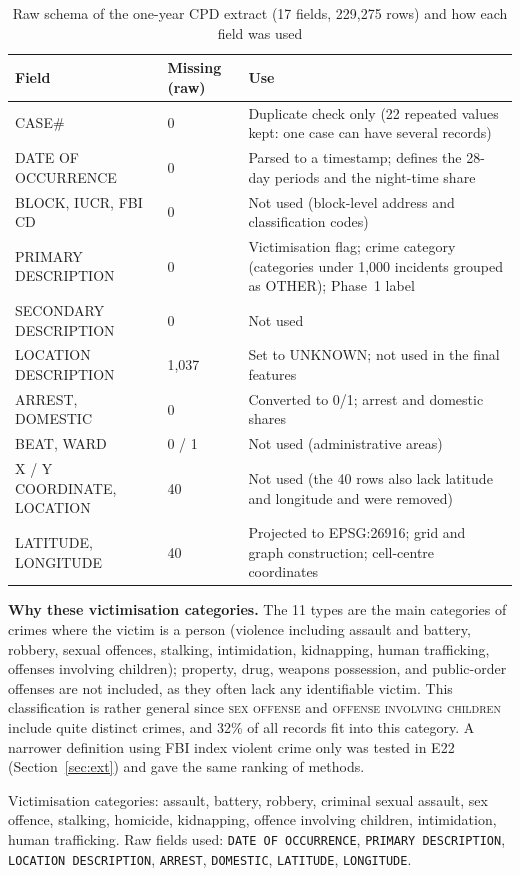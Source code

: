 \documentclass[11pt,a4paper]{report}
\begin{document}
\begin{table}[H]
\centering\scriptsize
\caption{Raw schema of the one-year CPD extract (17 fields, 229,275 rows) and how each field was used}
\label{tab:schema}
\begin{tabularx}{\textwidth}{@{}L{3.6cm} L{2.4cm} Y@{}}
\toprule
Field & Missing (raw) & Use\\
\midrule
CASE\# & 0 & Duplicate check only (22 repeated values kept: one case can have several records)\\
DATE OF OCCURRENCE & 0 & Parsed to a timestamp; defines the 28-day periods and the night-time share\\
BLOCK, IUCR, FBI CD & 0 & Not used (block-level address and classification codes)\\
PRIMARY DESCRIPTION & 0 & Victimisation flag; crime category (categories under 1,000 incidents grouped as OTHER); Phase~1 label\\
SECONDARY DESCRIPTION & 0 & Not used\\
LOCATION DESCRIPTION & 1,037 & Set to UNKNOWN; not used in the final features\\
ARREST, DOMESTIC & 0 & Converted to 0/1; arrest and domestic shares\\
BEAT, WARD & 0 / 1 & Not used (administrative areas)\\
X / Y COORDINATE, LOCATION & 40 & Not used (the 40 rows also lack latitude and longitude and were removed)\\
LATITUDE, LONGITUDE & 40 & Projected to EPSG:26916; grid and graph construction; cell-centre coordinates\\
\bottomrule
\end{tabularx}
\end{table}

\noindent\textbf{Why these victimisation categories.} The 11 types are the main categories of crimes where the victim is a person (violence including assault and battery, robbery, sexual offences, stalking, intimidation, kidnapping, human trafficking, offenses involving children); property, drug, weapons possession, and public-order offenses are not included, as they often lack any identifiable victim. This classification is rather general since \textsc{sex offense} and \textsc{offense involving children} include quite distinct crimes, and 32\% of all records fit into this category. A narrower definition using FBI index violent crime only was tested in E22 (Section~\ref{sec:ext}) and gave the same ranking of methods.


\noindent Victimisation categories: assault, battery, robbery, criminal sexual assault, sex offence, stalking, homicide, kidnapping, offence involving children, intimidation, human trafficking. Raw fields used: \texttt{DATE OF OCCURRENCE}, \texttt{PRIMARY DESCRIPTION}, \texttt{LOCATION DESCRIPTION}, \texttt{ARREST}, \texttt{DOMESTIC}, \texttt{LATITUDE}, \texttt{LONGITUDE}.
\end{document}
